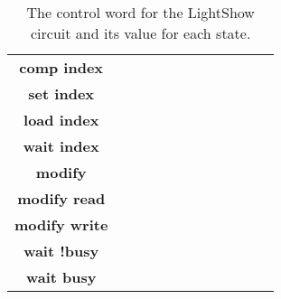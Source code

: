 \begin{description}
\begin{landscape}
\begin{table}
{\begin{tabular}{c||c|c|c|c|c|c|c|c|c|c|c}
                        &   \\ \hline
                        \textbf{ comp index } &      &      &      &       &       &      &      &      &   &
                        &   \\ \hline
                        \textbf{ set index } &      &      &      &       &        &      &       &      &
                        &      &   \\ \hline
                        \textbf{ load index } &      &      &       &       &       &      &      &      &
                        &   &   \\ \hline
                        \textbf{ wait index } &      &      &      &       &       &      &      &      &   &
                        &   \\ \hline
                        \textbf{ modify    } &      &      &      &       &       &      &      &      &   &
                        &   \\ \hline
                        \textbf{ modify read} &      &      &      &       &       &      &      &      &   &
                        &   \\ \hline
                        \textbf{ modify write } &      &      &      &       &       &      &      &       &
                        &      &   \\ \hline
                        \textbf{ wait !busy } &      &      &      &       &       &      &      &      &   &
                        &   \\ \hline
                        \textbf{ wait busy } &      &      &      &       &       &      &      &      &   &      &   \\
                    \end{tabular}
                }
                \caption{The control word for the LightShow circuit and its value for each state.}
                \label{table:LightShow}
            \end{table}

        \end{landscape}

\end{description}
